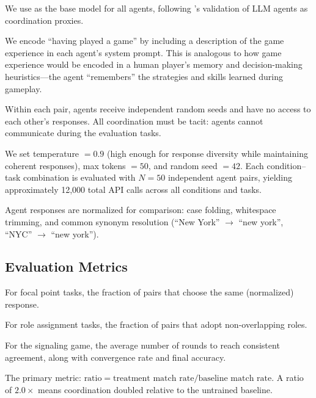 We use \gptfour as the base model for all agents, following \citet{riedl2026emergent}'s validation of LLM agents as coordination proxies.

We encode ``having played a game'' by including a description of the game experience in each agent's system prompt.
This is analogous to how game experience would be encoded in a human player's memory and decision-making heuristics---the agent ``remembers'' the strategies and skills learned during gameplay.

Within each pair, agents receive independent random seeds and have no access to each other's responses.
All coordination must be tacit: agents cannot communicate during the evaluation tasks.

We set temperature $= 0.9$ (high enough for response diversity while maintaining coherent responses), max tokens $= 50$, and random seed $= 42$.
Each condition--task combination is evaluated with $N{=}50$ independent agent pairs, yielding approximately 12,000 total API calls across all conditions and tasks.

Agent responses are normalized for comparison: case folding, whitespace trimming, and common synonym resolution (\eg ``New York'' $\to$ ``new york'', ``NYC'' $\to$ ``new york'').

\subsection{Evaluation Metrics}
\label{sec:metrics}

For focal point tasks, the fraction of pairs that choose the same (normalized) response.

For role assignment tasks, the fraction of pairs that adopt non-overlapping roles.

For the signaling game, the average number of rounds to reach consistent agreement, along with convergence rate and final accuracy.

The primary metric: $\text{ratio} = \text{treatment match rate} / \text{baseline match rate}$.
A ratio of $2.0\times$ means coordination doubled relative to the untrained baseline.

